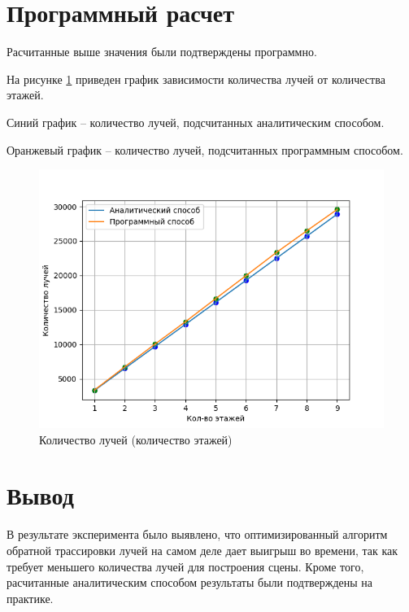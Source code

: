 \section{Программный расчет}
Расчитанные выше значения были подтверждены программно.

На рисунке \ref{img:e4} приведен график зависимости количества лучей от количества этажей.

Синий график -- количество лучей, подсчитанных аналитическим способом. 

Оранжевый график -- количество лучей, подсчитанных программным способом.

\begin{figure}[H]
	\begin{center}
		\includegraphics[scale=0.80]{img/res/e4.png}
	\end{center}
	\captionsetup{justification=centering}
	\caption{Количество лучей (количество этажей)}
	\label{img:e4}
\end{figure}



\section{Вывод}

В результате эксперимента было выявлено, что оптимизированный алгоритм обратной трассировки лучей на самом деле дает выигрыш во времени, так как требует меньшего количества лучей для построения сцены. Кроме того, расчитанные аналитическим способом результаты были подтверждены на практике.

